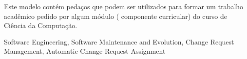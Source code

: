 Este modelo contém pedaços que podem ser utilizados para formar um trabalho acadêmico pedido por algum módulo ( componente curricular) do curso de Ciência da Computação.

\begin{keywords}
Software Engineering, Software Maintenance and Evolution, Change Request
Management, Automatic Change Request Assignment
\end{keywords}